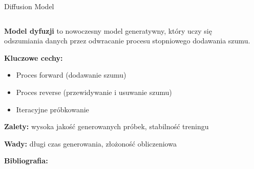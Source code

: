 \documentclass{beamer}
\begin{document}
\begin{frame}{Diffusion Model}
  \begin{columns}
    \begin{column}{0.6\textwidth}
    \textbf{Model dyfuzji} to nowoczesny model generatywny, który uczy się odszumiania danych przez odwracanie procesu stopniowego dodawania szumu.
    
    \medskip
    \textbf{Kluczowe cechy:}
    \begin{itemize}
    \item Proces forward (dodawanie szumu)
    \item Proces reverse (przewidywanie i usuwanie szumu)
    \item Iteracyjne próbkowanie
    \end{itemize}
    
    \textbf{Zalety:} wysoka jakość generowanych próbek, stabilność treningu
    
    \textbf{Wady:} długi czas generowania, złożoność obliczeniowa
    
    \textbf{Bibliografia:} \cite{ho2020denoising}
    \end{column}
    \begin{column}{0.4\textwidth}
    \centering
    \end{column}
  \end{columns}
\end{frame}
\end{document}
